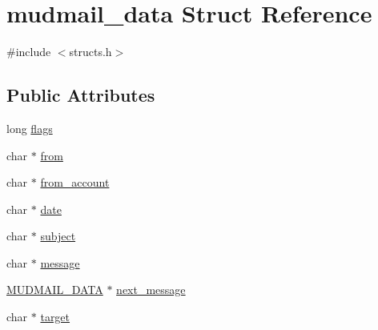 \hypertarget{structmudmail__data}{\section{mudmail\-\_\-data Struct Reference}
\label{structmudmail__data}
}


{\ttfamily \#include $<$structs.\-h$>$}

\subsection*{Public Attributes}
\begin{DoxyCompactItemize}
\item 
long \hyperlink{structmudmail__data_a147f443bec36861233b0a60b6e0f7af5}{flags}
\item 
char $\ast$ \hyperlink{structmudmail__data_a848d4702ba770327fa5aff376bc92198}{from}
\item 
char $\ast$ \hyperlink{structmudmail__data_a1ed7bbe5b5ef960746276eec8dcb6fd2}{from\-\_\-account}
\item 
char $\ast$ \hyperlink{structmudmail__data_afe51d78012144e891770924377d69cb0}{date}
\item 
char $\ast$ \hyperlink{structmudmail__data_a20c6c5399fff1a90cdac0c0b73002015}{subject}
\item 
char $\ast$ \hyperlink{structmudmail__data_a2c7609bbdbdbc97bc887169c3d1695b0}{message}
\item 
\hyperlink{structs_8h_a7bddf45d6afddee3794ae45b18620e5f}{M\-U\-D\-M\-A\-I\-L\-\_\-\-D\-A\-T\-A} $\ast$ \hyperlink{structmudmail__data_ad9ea84d9aee3e14620844b27cb7fb339}{next\-\_\-message}
\item 
char $\ast$ \hyperlink{structmudmail__data_af9ab5071510e2e8cd1baabb8cce608ef}{target}
\end{DoxyCompactItemize}



